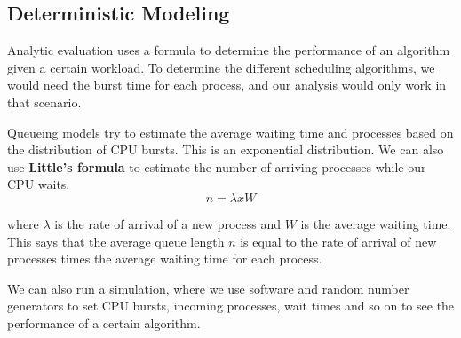 \documentclass{tufte-handout}
\begin{document}
\subsection{Deterministic Modeling}
Analytic evaluation uses a formula to determine the performance of an algorithm given a certain 
workload. To determine the different scheduling algorithms, we would need the burst time for 
each process, and our analysis would only work in that scenario. 

Queueing models try to estimate the average waiting time and processes based on the distribution
of CPU bursts. This is an exponential distribution. We can also use \textbf{Little's formula}
to estimate the number of arriving processes while our CPU waits.
\[n = \lambda x W\]

where $\lambda$ is the rate of arrival of a new process and $W$ is the average waiting time. 
This says that the average queue length $n$ is equal to the rate of arrival of new processes
times the average waiting time for each process.

We can also run a simulation, where we use software and random number generators to set 
CPU bursts, incoming processes, wait times and so on to see the performance of a certain 
algorithm.
\end{document}
